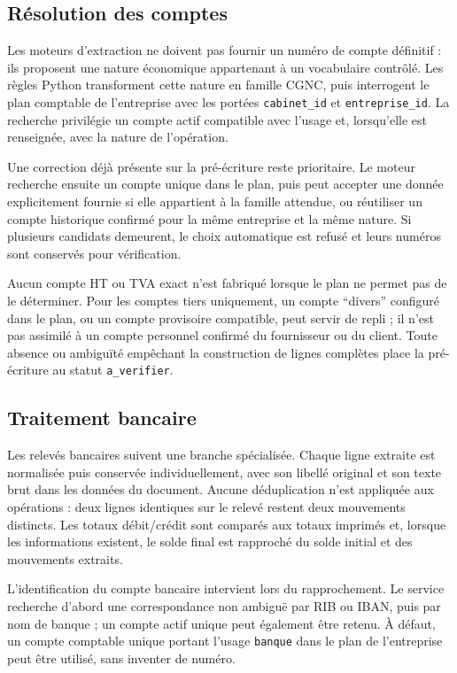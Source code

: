 \documentclass[12pt,a4paper,oneside]{report}
\begin{document}
\subsection{Résolution des comptes}

Les moteurs d'extraction ne doivent pas fournir un numéro de compte définitif :
ils proposent une nature économique appartenant à un vocabulaire contrôlé.
Les règles Python transforment cette nature en famille CGNC\cite{cgnc}, puis interrogent
le plan comptable de l'entreprise avec les portées \texttt{cabinet\_id} et
\texttt{entreprise\_id}. La recherche privilégie un compte actif compatible
avec l'usage et, lorsqu'elle est renseignée, avec la nature de l'opération.

Une correction déjà présente sur la pré-écriture reste prioritaire. Le moteur
recherche ensuite un compte unique dans le plan, puis peut accepter une donnée
explicitement fournie si elle appartient à la famille attendue, ou réutiliser
un compte historique confirmé pour la même entreprise et la même nature. Si
plusieurs candidats demeurent, le choix automatique est refusé et leurs
numéros sont conservés pour vérification.

Aucun compte HT ou TVA exact n'est fabriqué lorsque le plan ne permet pas de le
déterminer. Pour les comptes tiers uniquement, un compte ``divers'' configuré
dans le plan, ou un compte provisoire compatible, peut servir de repli ; il
n'est pas assimilé à un compte personnel confirmé du fournisseur ou du client.
Toute absence ou ambiguïté empêchant la construction de lignes complètes place
la pré-écriture au statut \texttt{a\_verifier}.

\subsection{Traitement bancaire}

Les relevés bancaires suivent une branche spécialisée. Chaque ligne extraite est
normalisée puis conservée individuellement, avec son libellé original et son
texte brut dans les données du document. Aucune déduplication n'est appliquée
aux opérations : deux lignes identiques sur le relevé restent deux mouvements
distincts. Les totaux débit/crédit sont comparés aux totaux imprimés et, lorsque
les informations existent, le solde final est rapproché du solde initial et des
mouvements extraits.

L'identification du compte bancaire intervient lors du rapprochement. Le
service recherche d'abord une correspondance non ambiguë par RIB ou IBAN, puis
par nom de banque ; un compte actif unique peut également être retenu. À défaut,
un compte comptable unique portant l'usage \texttt{banque} dans le plan de
l'entreprise peut être utilisé, sans inventer de numéro.
\end{document}
